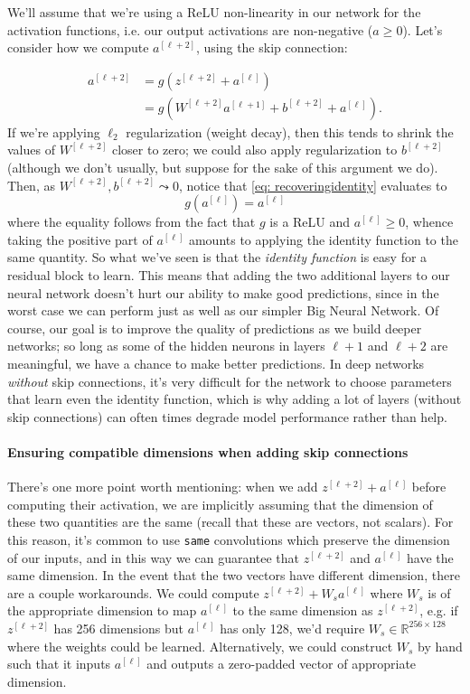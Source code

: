 \documentclass[12pt]{article}
\begin{document}
We'll assume that we're using a ReLU non-linearity in our network for the activation functions, i.e. our output activations
are non-negative ($a \geq 0$). Let's consider how we compute $a^{[\ell+2]}$, using the skip connection:

\begin{align}   a^{[\ell+2]} &= g(z^{[\ell+2]} + a^{[\ell]}) \nonumber \\ 
  \label{eq: recoveringidentity}
             &= g(W^{[\ell+2]} a^{[\ell+1]} + b^{[\ell+2]} + a^{[\ell]}). \end{align}
If we're applying $\ell_2$ regularization (weight decay), then this tends to shrink the values of $W^{[\ell+2]}$ closer to zero;
we could also apply regularization to $b^{[\ell+2]}$ (although we don't usually, but suppose for the sake of this argument we do).
Then, as $W^{[\ell+2]}, b^{[\ell+2]} \leadsto 0$, notice that \ref{eq: recoveringidentity} evaluates to
\[
g(a^{[\ell]}) = a^{[\ell]}
\]
where the equality follows from the fact that $g$ is a ReLU and $a^{[\ell]} \geq 0$, whence taking the positive part of $a^{[\ell]}$ amounts to applying the identity function to the same quantity. So what we've seen is that the \emph{identity function} is easy
for a residual block to learn. This means that adding the two additional layers to our neural network doesn't hurt our ability
to make good predictions, since in the worst case we can perform just as well as our simpler Big Neural Network.
Of course, our goal is to improve the quality of predictions as we build deeper networks; so long as some of the hidden neurons
in layers $\ell+1$ and $\ell+2$ are meaningful, we have a chance to make better predictions. In deep networks \emph{without}
skip connections, it's very difficult for the network to choose parameters that learn even the identity function, which is why
adding a lot of layers (without skip connections) can often times degrade model performance rather than help.

\paragraph{Ensuring compatible dimensions when adding skip connections}
There's one more point worth mentioning: when we add $z^{[\ell+2]} + a^{[\ell]}$ before computing their activation, we are implicitly
assuming that the dimension of these two quantities are the same (recall that these are vectors, not scalars). 
For this reason, it's common to use \texttt{same} convolutions
which preserve the dimension of our inputs, and in this way we can guarantee that $z^{[\ell+2]}$ and $a^{[\ell]}$ have the 
same dimension. In the event that the two vectors have different dimension, there are a couple workarounds. 
We could compute $z^{[\ell+2]} + W_s a^{[\ell]}$ where $W_s$ is of the appropriate dimension to map $a^{[\ell]}$ to
the same dimension as $z^{[\ell+2]}$, e.g. if $z^{[\ell+2]}$ has 256 dimensions but $a^{[\ell]}$ has only 128, we'd require
$W_s \in \mathbb R^{256 \times 128}$ where the weights could be learned. Alternatively, we could construct $W_s$ by hand such that
it inputs $a^{[\ell]}$ and outputs a zero-padded vector of appropriate dimension.
\end{document}
